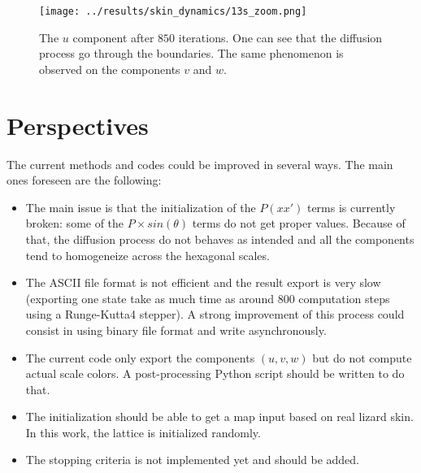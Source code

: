 \documentclass[a4paper]{article}
\begin{document}
\begin{figure}
\label{fig:init_state_u_13s}
	\texttt{[image: ../results/skin\_dynamics/13s\_zoom.png]}
	\caption{The $u$ component after $850$ iterations. One can see that the diffusion process go through the boundaries. The same phenomenon is observed on the components $v$ and $w$.}
\end{figure}

\section{Perspectives}
\label{sec:perspectives}

The current methods and codes could be improved in several ways. The main ones foreseen are the following:
\begin{itemize}
	\item The main issue is that the initialization of the $P(xx')$ terms is currently broken: some of the $P \times sin(\theta)$ terms do not get proper values. Because of that, the diffusion process do not behaves as intended and all the components tend to homogeneize across the hexagonal scales.
	\item The ASCII file format is not efficient and the result export is very slow (exporting one state take as much time as around 800 computation steps using a Runge-Kutta4 stepper). A strong improvement of this process could consist in using binary file format and write asynchronously.
	\item The current code only export the components $(u, v, w)$ but do not compute actual scale colors. A post-processing Python script should be written to do that.
	\item The initialization should be able to get a map input based on real lizard skin. In this work, the lattice is initialized randomly.
	\item The stopping criteria is not implemented yet and should be added.
\end{itemize}



\listoffigures
\end{document}
